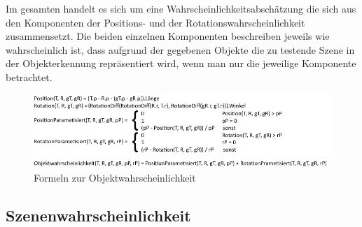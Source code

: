 Im gesamten handelt es sich um eine Wahrscheinlichkeitsabschätzung die sich aus den Komponenten der Positions- und der Rotationswahrscheinlichkeit zusammensetzt. Die beiden einzelnen Komponenten beschreiben jeweils wie wahrscheinlich ist, dass aufgrund der gegebenen Objekte die zu testende Szene in der Objekterkennung repräsentiert wird, wenn man nur die jeweilige Komponente betrachtet.
\begin{figure}
	\centering
	\includegraphics[width=16cm]{bilder/Formeln.pdf}
	\caption{Formeln zur Objektwahrscheinlichkeit}
	\label{img:formelnObj}
\end{figure}

\subsection{Szenenwahrscheinlichkeit}
